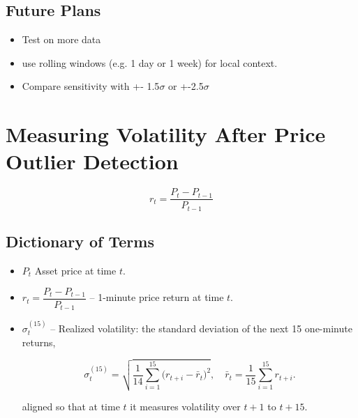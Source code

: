 \documentclass[12pt]{article}
\begin{document}
\subsection*{Future Plans}

\begin{itemize}
    \item Test on more data
    \item use rolling windows (e.g. 1 day or 1 week) for local context.
    \item Compare sensitivity with +- 1.5$\sigma$ or +-2.5$\sigma$
\end{itemize}

\newpage





\section*{Measuring Volatility After Price Outlier Detection}


\begin{equation}\label{eq:price_return}
    r_t = \frac{P_{t} - P_{t-1}}{P_{t-1}}
\end{equation}


\subsection*{Dictionary of Terms}

\begin{itemize}
    \item $P_t$  
      Asset price at time $t$.
    \item $r_t = \dfrac{P_t - P_{t-1}}{P_{t-1}}$  
      – 1-minute price return at time $t$.
    \item $\sigma^{\mathrm{(15)}}_{t}$  
      – Realized volatility: the standard deviation of the next 15 one-minute returns,
      
      

      
      \begin{equation}\label{eq:realized-vol}
        \sigma^{\mathrm{(15)}}_{t}
        = \sqrt{\frac{1}{14}\sum_{i=1}^{15}\bigl(r_{t+i}-\bar r_{t}\bigr)^{2}},
        \quad
        \bar r_{t} = \frac{1}{15}\sum_{i=1}^{15} r_{t+i}.
      \end{equation}
      



      aligned so that at time $t$ it measures volatility over $t+1$ to $t+15$.
\end{itemize}
\end{document}
